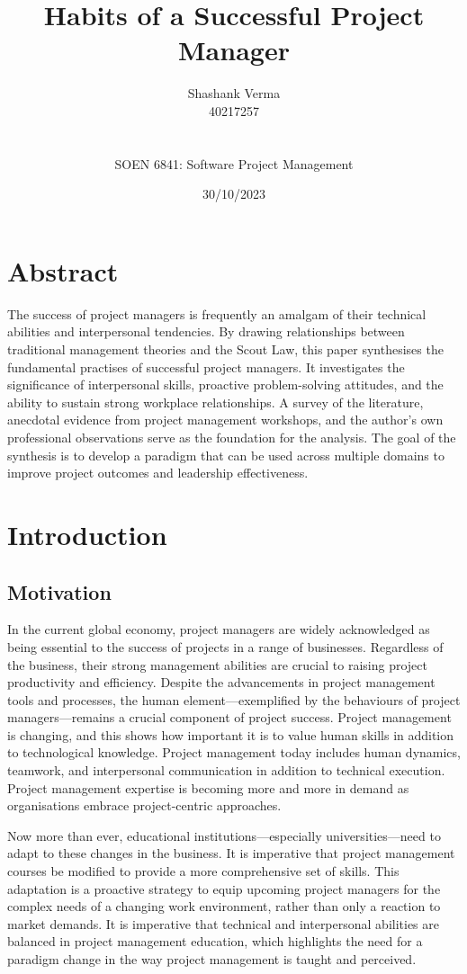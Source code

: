 \documentclass{article}
\title{Habits of a Successful Project Manager}
\author{Shashank Verma \\ 40217257
\\
\\
\\
SOEN 6841: Software Project Management}
\date{30/10/2023}
\begin{document}
\maketitle
{}

\newpage
\tableofcontents
\newpage
{}

\section{Abstract}
The success of project managers is frequently an amalgam of their technical abilities and interpersonal tendencies. By drawing relationships between traditional management theories and the Scout Law, this paper synthesises the fundamental practises of successful project managers. It investigates the significance of interpersonal skills, proactive problem-solving attitudes, and the ability to sustain strong workplace relationships. A survey of the literature, anecdotal evidence from project management workshops, and the author's own professional observations serve as the foundation for the analysis. The goal of the synthesis is to develop a paradigm that can be used across multiple domains to improve project outcomes and leadership effectiveness.

\section{Introduction}
\subsection{Motivation}
In the current global economy, project managers are widely acknowledged as being essential to the success of projects in a range of businesses. Regardless of the business, their strong management abilities are crucial to raising project productivity and efficiency. Despite the advancements in project management tools and processes, the human element—exemplified by the behaviours of project managers—remains a crucial component of project success. Project management is changing, and this shows how important it is to value human skills in addition to technological knowledge. Project management today includes human dynamics, teamwork, and interpersonal communication in addition to technical execution. Project management expertise is becoming more and more in demand as organisations embrace project-centric approaches. \cite{pant2008project}

Now more than ever, educational institutions—especially universities—need to adapt to these changes in the business. It is imperative that project management courses be modified to provide a more comprehensive set of skills. This adaptation is a proactive strategy to equip upcoming project managers for the complex needs of a changing work environment, rather than only a reaction to market demands. It is imperative that technical and interpersonal abilities are balanced in project management education, which highlights the need for a paradigm change in the way project management is taught and perceived.
\end{document}
